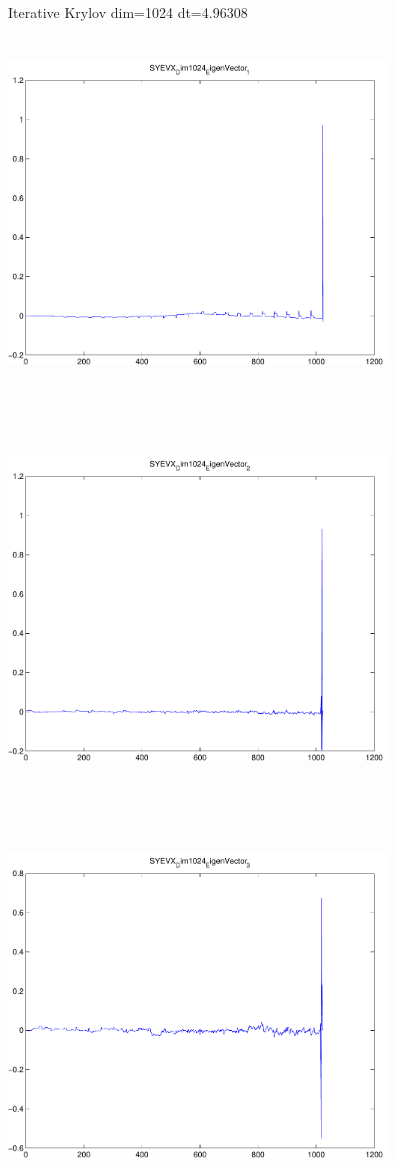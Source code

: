 \documentclass[9pt]{article}
\theoremstyle{plain}
\theoremstyle{definition}
\theoremstyle{remark}
\numberwithin{equation}{section}
\begin{document}
Iterative Krylov dim=1024 dt=4.96308
\includegraphics[width=10.0cm,height=10.0cm]{SYEVX_Dim1024_EigenVector_1.pdf}

\includegraphics[width=10.0cm,height=10.0cm]{SYEVX_Dim1024_EigenVector_2.pdf}

\includegraphics[width=10.0cm,height=10.0cm]{SYEVX_Dim1024_EigenVector_3.pdf}
\end{document}
